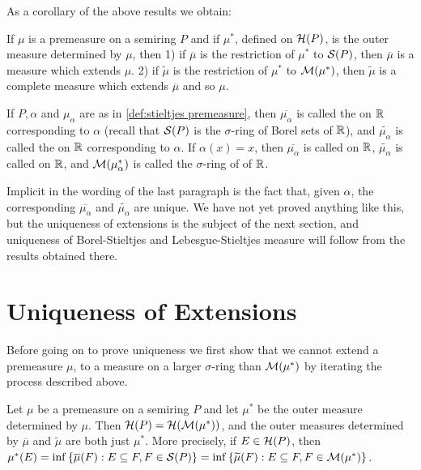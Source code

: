 As a corollary of the above results we obtain:

\begin{theorem}\label{thm:measure extension thm}
If $\mu$ is a premeasure on a semiring $P$ and if $\mu^*$, defined on ${\cal H}(P)$, is the outer measure determined by $\mu$, then 1) if $\overline{\mu}$ is the restriction of $\mu^*$ to ${\cal S}(P)$, then $\overline{\mu}$ is a measure which extends $\mu$. 2) if $\widetilde{\mu}$ is the restriction of $\mu^*$ to ${\cal M}(\mu^*)$, then $\widetilde{\mu}$ is a complete measure which extends $\overline{\mu}$ and so $\mu$.
\end{theorem}

\begin{definition}
If $P,\alpha$ and $\mu_\alpha$ are as in \ref{def:stieltjes premeasure}, then $\overline{\mu_\alpha}$ is called the  on $\mathbb{R}$ corresponding to $\alpha$ (recall that ${\cal S}(P)$ is the $\sigma$-ring of Borel sets of $\mathbb{R}$), and $\widetilde{\mu_\alpha}$ is called the  on $\mathbb{R}$ corresponding to $\alpha$. If $\alpha(x)=x$, then $\overline{\mu_\alpha}$ is called  on $\mathbb{R}$, $\widetilde{\mu_\alpha}$ is called  on $\mathbb{R}$, and ${\cal M}(\mu_\alpha^*)$ is called the $\sigma$-ring of  of $\mathbb{R}$.
\end{definition}

Implicit in the wording of the last paragraph is the fact that, given $\alpha$, the corresponding $\overline{\mu_\alpha}$ and $\widetilde{\mu_\alpha}$ are unique. We have not yet proved anything like this, but the uniqueness of extensions is the subject of the next section, and uniqueness of Borel-Stieltjes and Lebesgue-Stieltjes measure will follow from the results obtained there.

\section{Uniqueness of Extensions}

Before going on to prove uniqueness we first show that we cannot extend a premeasure $\mu$, to a measure on a larger $\sigma$-ring than ${\cal M}(\mu^*)$ by iterating the process described above.

\begin{proposition}\label{prop:repeated outer measure}
Let $\mu$ be a premeasure on a semiring $P$ and let $\mu^*$ be the outer measure determined by $\mu$. Then ${\cal H}(P)={\cal H}({\cal M}(\mu^*))$, and the outer measures determined by $\overline{\mu}$ and $\widetilde{\mu}$ are both just $\mu^*$. More precisely, if $E\in{\cal H}(P)$, then $\mu^*(E)=\inf\left\{\overline{\mu}(F):E\subseteq F,F\in{\cal S}(P)\right\}=\allowbreak\inf\left\{\widetilde{\mu}(F):E\subseteq F,F\in{\cal M}(\mu^*)\right\}$.
\end{proposition}

